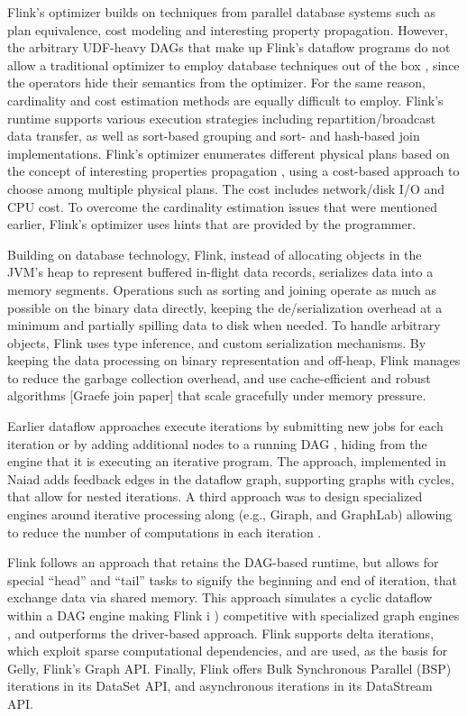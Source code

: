  Flink’s optimizer builds on techniques from parallel database systems such as plan equivalence, cost modeling and interesting property propagation. However, the arbitrary UDF-heavy DAGs that make up Flink’s dataflow programs do not allow a traditional optimizer to employ database techniques out of the box \cite{blackBoxes}, since the operators hide their semantics from the optimizer. For the same reason, cardinality and cost estimation methods are equally difficult to employ. Flink’s runtime supports various execution strategies including repartition/broadcast data transfer, as well as sort-based grouping and sort- and hash-based join implementations. Flink’s optimizer enumerates different physical plans based on the concept of interesting properties propagation \cite{scopeOptimizer}, using a cost-based approach to choose among multiple physical plans. The cost includes network/disk I/O and CPU cost. To overcome the cardinality estimation issues that were mentioned earlier,  Flink’s optimizer uses hints that are provided by the programmer.


 Building on database technology, Flink, instead of allocating objects in the JVM’s heap to represent buffered in-flight data records, serializes data into a  memory segments. Operations such as sorting and joining operate as much as possible on the binary data directly, keeping the de/serialization overhead at a minimum and partially spilling data to disk when needed. To handle arbitrary objects, Flink uses type inference, and  custom serialization mechanisms.  By keeping the data processing on binary representation and off-heap, Flink manages to reduce the garbage collection overhead, and use cache-efficient and robust algorithms [Graefe join paper] that scale gracefully under memory pressure.

  Earlier dataflow approaches execute iterations by submitting new jobs for each iteration or by adding additional nodes to a running DAG \cite{DBLP:journals/pvldb/BuHBE10, DBLP:conf/hotcloud/ZahariaCFSS10}, hiding from  the engine that it is executing an iterative program. The approach, implemented in Naiad \cite{murray2013naiad} adds feedback edges in the dataflow graph, supporting graphs with cycles, that  allow for nested iterations. A third approach was to design specialized engines around iterative processing along (e.g., Giraph, and GraphLab) allowing to reduce the number of computations in each iteration \cite{low2012distributed}.

Flink follows an approach that retains the DAG-based runtime, but allows for special “head” and “tail” tasks to signify the beginning and end of iteration, that exchange data via shared memory. This approach simulates a cyclic dataflow within a DAG engine making Flink i ) competitive with specialized graph engines \cite{DBLP:journals/pvldb/EwenTKM12}, and outperforms the driver-based approach. Flink supports delta iterations, which exploit sparse computational dependencies, and are used, as the basis for Gelly, Flink’s Graph API. Finally, Flink offers Bulk Synchronous Parallel (BSP) iterations in its DataSet API, and asynchronous iterations in its DataStream API.
